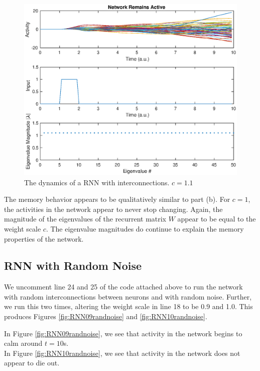 \documentclass[11pt, oneside]{article}
\begin{document}
\begin{figure}[H]
\includegraphics[width=1\textwidth]{RNN11rand.eps}
\caption{The dynamics of a RNN with interconnections. $c = 1.1$}
\label{fig:RNN11rand}
\end{figure}

The memory behavior appears to be qualitatively similar to part (b). For $c=1$, the activities in the network appear to never stop changing. Again, the magnitude of the eigenvalues of the recurrent matrix $W$ appear to be equal to the weight scale $c$. The eigenvalue magnitudes do continue to explain the memory properties of the network.

\subsection{RNN with Random Noise}

We uncomment line 24 and 25 of the code attached above to run the network with random interconnections between neurons and with random noise. Further, we run this two times, altering the weight scale in line 18 to be 0.9 and 1.0. This produces Figures \ref{fig:RNN09randnoise} and \ref{fig:RNN10randnoise}.

In Figure \ref{fig:RNN09randnoise}, we see that activity in the network begins to calm around $t=10$s. \\
In Figure \ref{fig:RNN10randnoise}, we see that activity in the network does not appear to die out.\\
\end{document}
